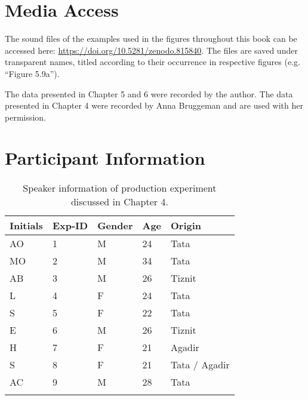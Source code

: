 \setcounter{chapter}{1}
\section{Media Access}
The sound files of the examples used in the figures throughout this book can be accessed here: \url{https://doi.org/10.5281/zenodo.815840}. The files are saved under transparent names, titled according to their occurrence in respective figures (e.g. “Figure 5.9a”).

The data presented in Chapter 5 and 6 were recorded by the author. The data presented in Chapter 4 were recorded by Anna Bruggeman and are used with her permission.

\section{Participant Information}
\begin{table}
\caption{Speaker information of production experiment discussed in Chapter 4.}
\label{Table A1}
\begin{tabular}{lllll}
\lsptoprule
\textbf{Initials}                        & \textbf{Exp-ID} & \textbf{Gender} & \textbf{Age} & \textbf{Origin}        \\
\midrule
AO                              & 1      & M      & 24  & Tata          \\
MO                              & 2      & M      & 34  & Tata          \\
AB                              & 3      & M      & 26  & Tiznit        \\
L                               & 4      & F      & 24  & Tata          \\
S                               & 5      & F      & 22  & Tata          \\
E                               & 6      & M      & 26  & Tiznit        \\
H                               & 7      & F      & 21  & Agadir        \\
S                               & 8      & F      & 21  & Tata / Agadir \\
AC                              & 9      & M      & 28  & Tata         \\
\lspbottomrule
\end{tabular}
\end{table}

